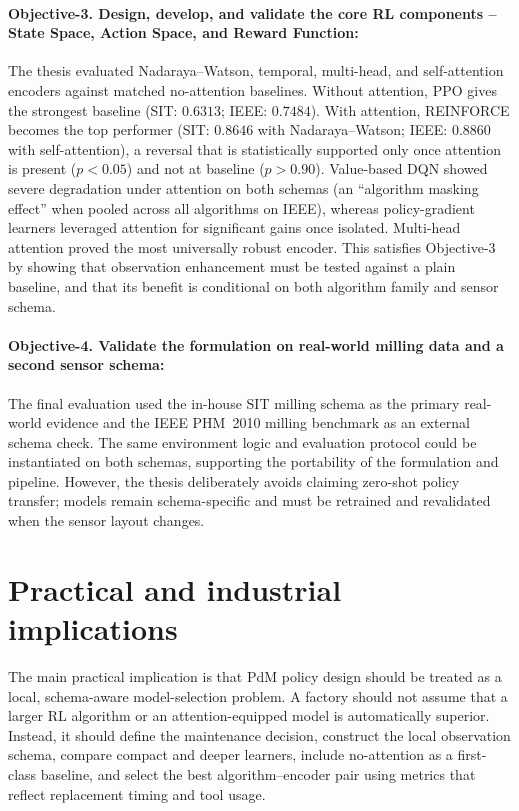\documentclass[12pt,oneside]{book}
\begin{document}
\paragraph{Objective-3. Design, develop, and validate the core RL components – State Space, Action Space, and Reward Function:}
The thesis evaluated Nadaraya--Watson, temporal, multi-head, and self-attention encoders against matched no-attention baselines. Without attention, \textsc{PPO} gives the strongest baseline (SIT: $0.6313$; IEEE: $0.7484$). With attention, \textsc{REINFORCE} becomes the top performer (SIT: $0.8646$ with Nadaraya--Watson; IEEE: $0.8860$ with self-attention), a reversal that is statistically supported only once attention is present ($p<0.05$) and not at baseline ($p>0.90$). Value-based \textsc{DQN} showed severe degradation under attention on both schemas (an ``algorithm masking effect'' when pooled across all algorithms on IEEE), whereas policy-gradient learners leveraged attention for significant gains once isolated. Multi-head attention proved the most universally robust encoder. This satisfies Objective-3 by showing that observation enhancement must be tested against a plain baseline, and that its benefit is conditional on both algorithm family and sensor schema.

\paragraph{Objective-4. Validate the formulation on real-world milling data and a second sensor schema:}
The final evaluation used the in-house SIT milling schema as the primary real-world evidence and the IEEE PHM~2010 milling benchmark as an external schema check. The same environment logic and evaluation protocol could be instantiated on both schemas, supporting the portability of the formulation and pipeline. However, the thesis deliberately avoids claiming zero-shot policy transfer; models remain schema-specific and must be retrained and revalidated when the sensor layout changes.

\section{Practical and industrial implications}
The main practical implication is that PdM policy design should be treated as a local, schema-aware model-selection problem. A factory should not assume that a larger RL algorithm or an attention-equipped model is automatically superior. Instead, it should define the maintenance decision, construct the local observation schema, compare compact and deeper learners, include no-attention as a first-class baseline, and select the best algorithm--encoder pair using metrics that reflect replacement timing and tool usage.
\end{document}
